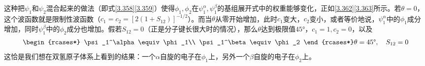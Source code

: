 这种把$\psi_1$和$\psi_2$混合起来的做法（即式\eqref{3.358}\eqref{3.359}）使得$\phi_1,\phi_2$在$\psi_1^\alpha,\psi_1^\beta$的基组展开式中的权重能够变化，正如\eqref{3.362}\eqref{3.363}所示。若$\theta=0$，这个波函数就是限制性波函数（$c_1=c_2=[2(1+S_{12} )]^{-1/2}$）。而当$\theta$从零开始增加，此时$c_1$变大，$c_2$变小，或者等价地说，$\psi_1^\alpha$中的$\phi_1$成分增加，同时$\psi_1^\beta$中的$\phi_2$成分也增加。假若$S_{12}=0$（正是分子键长很大时的情况），那么$\theta$达到极限值$45\text{°}$，$c_1=1,c_2=0$，以及
\begin{align}
\begin{rcases*}
\psi_1^\alpha \equiv \phi_1\\
\psi_1^\beta \equiv \phi_2
\end{rcases*}\theta = 45\text{°},\quad S_{12}=0
\end{align}
这恰是我们想在双氢原子体系上看到的结果：一个$\alpha$自旋的电子在$\phi_1$上，另外一个$\beta$自旋的电子在$\phi_2$上。








\theendnotes
